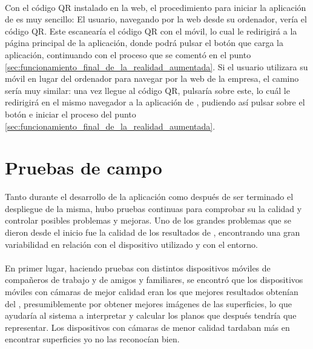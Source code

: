 \documentclass{subfiles}
\begin{document}
    \paragraph{}
    Con el código QR instalado en la web, el procedimiento para iniciar la aplicación de \ra es muy sencillo: El usuario, navegando por la web desde su ordenador, vería el código QR. Este escanearía el código QR con el móvil, lo cual le redirigirá a la página principal de la aplicación, donde podrá pulsar el botón que carga la aplicación, continuando con el proceso que se comentó en el punto \ref{sec:funcionamiento_final_de_la_realidad_aumentada}. Si el usuario utilizara su móvil en lugar del ordenador para navegar por la web de la empresa, el camino sería muy similar: una vez llegue al código QR, pulsaría sobre este, lo cuál le redirigirá en el mismo navegador a la aplicación de \ra, pudiendo así pulsar sobre el botón e iniciar el proceso del punto \ref{sec:funcionamiento_final_de_la_realidad_aumentada}.

    \section{Pruebas de campo}
    \label{sec:pruebas_de_campo}
    Tanto durante el desarrollo de la aplicación como después de ser terminado el despliegue de la misma, hubo pruebas continuas para comprobar su la calidad y controlar posibles problemas y mejoras. Uno de los grandes problemas que se dieron desde el inicio fue la calidad de los resultados de \hittest, encontrando una gran variabilidad en relación con el dispositivo utilizado y con el entorno.

    \paragraph{}
    En primer lugar, haciendo pruebas con distintos dispositivos móviles de compañeros de trabajo y de amigos y familiares, se encontró que los dispositivos móviles con cámaras de mejor calidad eran los que mejores resultados obtenían del \hittest, presumiblemente por obtener mejores imágenes de las superficies, lo que ayudaría al sistema a interpretar y calcular los planos que después tendría que representar. Los dispositivos con cámaras de menor calidad tardaban más en encontrar superficies y\/o no las reconocían bien.
\end{document}
